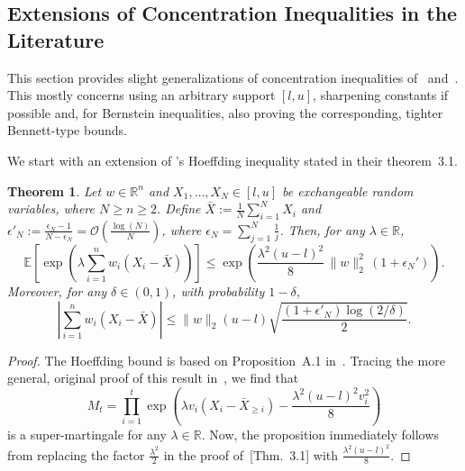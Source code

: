 \documentclass[aos]{imsart2}
\theoremstyle{plain}
\newtheorem{theorem}{Theorem}[section]
\theoremstyle{definition}
\newcommand{\R}{\mathbb{R}}
\newcommand{\E}{\mathbb{E}}
\begin{document}
\newpage
\begin{appendix}

\section{Extensions of Concentration Inequalities in the Literature}\label{app:extension-literature}

This section provides slight generalizations of concentration inequalities of~\cite{barber_hoeffding_2024} and~\cite{bardenet_concentration_2015}. This mostly concerns using an arbitrary support $[l,u]$, sharpening constants if possible and, for Bernstein inequalities, also proving the corresponding, tighter Bennett-type bounds.

We start with an extension of \cite{barber_hoeffding_2024}'s Hoeffding inequality stated in their theorem~3.1.
\begin{theorem}\label{prop:rina-hoeffding}
    Let $w \in \R^n$ and $X_1,\ldots,X_N \in [l,u]$ be exchangeable random variables, where $N \geq n \geq 2$. Define $\bar{X} := \frac{1}{N}\sum_{i=1}^N X_i$ and $\epsilon'_N := \frac{\epsilon_N-1}{N-\epsilon_N} = \mathcal{O}(\frac{\log(N)}{N})$, where $\epsilon_N = \sum_{j=1}^N \frac{1}{j}$. Then, for any $\lambda \in \R$,
    \begin{equation*}
        \E\left[\exp\left(\lambda \sum_{i=1}^n w_i (X_i - \bar{X}) \right)\right] \leq \exp\left(\frac{\lambda^2(u-l)^2}{8}\,\lVert w\rVert_2^2\,(1+\epsilon_N')\right).
    \end{equation*}
    Moreover, for any $\delta \in (0,1)$, with probability $1-\delta$,
    \begin{equation*}
        \left\vert\sum_{i=1}^n w_i (X_i - \bar{X})\right\vert  \leq \lVert w \rVert_2 (u-l) \sqrt{\frac{(1+\epsilon'_N)\log(2/\delta)}{2}}.
    \end{equation*}
\end{theorem}

\begin{proof}
    The Hoeffding bound is based on Proposition~A.1 in~\citet{barber_hoeffding_2024}. Tracing the more general, original proof of this result in~\citet{waudby-smith_confidence_2020}, we find that
    \begin{equation*}
        M_t = \prod_{i=1}^t \exp\left(\lambda v_i (X_i-\bar{X}_{\geq i})-\frac{\lambda^2 (u-l)^2 v_i^2 }{8}\right)
    \end{equation*}
    is a super-martingale for any $\lambda \in \R$. Now, the proposition immediately follows from replacing the factor $\frac{\lambda^2}{2}$ in the proof of~\citet{barber_hoeffding_2024}[Thm.~3.1] with $\frac{\lambda^2(u-l)^2}{8}$.
\end{proof}


\end{appendix}
\end{document}
